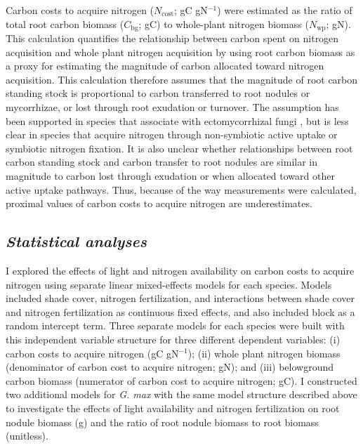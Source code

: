 Carbon costs to acquire nitrogen ($N_\mathrm{cost}$; gC gN$^{-1}$) were estimated as the ratio of total root carbon biomass ($C_\mathrm{bg}$; gC) to whole-plant nitrogen biomass ($N_\mathrm{wp}$; gN). This calculation quantifies the relationship between carbon spent on nitrogen acquisition and whole plant nitrogen acquisition by using root carbon biomass as a proxy for estimating the magnitude of carbon allocated toward nitrogen acquisition. This calculation therefore assumes that the magnitude of root carbon standing stock is proportional to carbon transferred to root nodules or mycorrhizae, or lost through root exudation or turnover. The assumption has been supported in species that associate with ectomycorrhizal fungi , but is less clear in species that acquire nitrogen through non-symbiotic active uptake or symbiotic nitrogen fixation. It is also unclear whether relationships between root carbon standing stock and carbon transfer to root nodules are similar in magnitude to carbon lost through exudation or when allocated toward other active uptake pathways. Thus, because of the way measurements were calculated, proximal values of carbon costs to acquire nitrogen are underestimates.

\subsection{\textit{Statistical analyses}}
\noindent I explored the effects of light and nitrogen availability on carbon costs to acquire nitrogen using separate linear mixed-effects models for each species. Models included shade cover, nitrogen fertilization, and interactions between shade cover and nitrogen fertilization as continuous fixed effects, and also included block as a random intercept term. Three separate models for each species were built with this independent variable structure for three different dependent variables: (i) carbon costs to acquire nitrogen (gC gN$^{-1}$); (ii) whole plant nitrogen biomass (denominator of carbon cost to acquire nitrogen; gN); and (iii) belowground carbon biomass (numerator of carbon cost to acquire nitrogen; gC). I constructed two additional models for \textit{G. max} with the same model structure described above to investigate the effects of light availability and nitrogen fertilization on root nodule biomass (g) and the ratio of root nodule biomass to root biomass (unitless).

